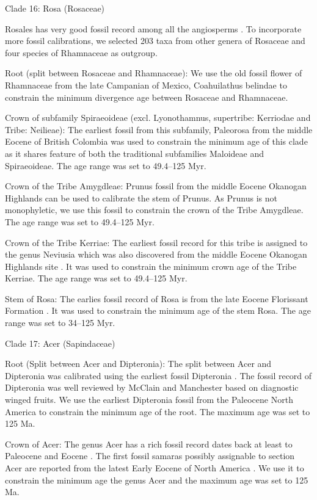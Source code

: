\documentclass[10pt]{article}
\begin{document}
Clade 16: Rosa (Rosaceae)

Rosales has very good fossil record among all the angiosperms
\citep{Xing2016}. To incorporate more fossil calibrations, we selected
203 taxa from other genera of Rosaceae and four species of Rhamnaceae
as outgroup.

Root (split between Rosaceae and Rhamnaceae): We use the old fossil
flower of Rhamnaceae from the late Campanian of Mexico, Coahuilathus
belindae \citep{Calvillo-Canadell2007} to constrain the minimum
divergence age between Rosaceae and Rhamnaceae.

Crown of subfamily Spiraeoideae (excl. Lyonothamnus, supertribe:
Kerriodae and Tribe: Neilieae): The earliest fossil from this
subfamily, Paleorosa from the middle Eocene of British Colombia
\citep{Basinger1976} was used to constrain the minimum age of this
clade as it shares feature of both the traditional subfamilies
Maloideae and Spiraeoideae. The age range was set to 49.4--125 Myr.

Crown of the Tribe Amygdleae: Prunus fossil from the middle Eocene
Okanogan Highlands \citep{DeVore2007} can be used to calibrate the
stem of Prunus. As Prunus is not monophyletic, we use this fossil to
constrain the crown of the Tribe Amygdleae. The age range was set to
49.4--125 Myr.

Crown of the Tribe Kerriae: The earliest fossil record for this tribe
is assigned to the genus Neviusia which was also discovered from the
middle Eocene Okanogan Highlands site \citep{DeVore2004}. It was used
to constrain the minimum crown age of the Tribe Kerriae. The age range
was set to 49.4--125 Myr.

Stem of Rosa: The earlies fossil record of Rosa is from the late
Eocene Florissant Formation \citep{Manchester2001}. It was used to
constrain the minimum age of the stem Rosa. The age range was set to
34--125 Myr.

Clade 17: Acer (Sapindaceae)

Root (Split between Acer and Dipteronia): The split between Acer and
Dipteronia was calibrated using the earliest fossil Dipteronia
\citep{McClain2001}. The fossil record of Dipteronia was well reviewed
by McClain and Manchester \citep{McClain2001} based on diagnostic
winged fruits. We use the earliest Dipteronia fossil from the
Paleocene North America to constrain the minimum age of the root. The
maximum age was set to 125 Ma.

Crown of Acer: The genus Acer has a rich fossil record dates back at
least to Paleocene and Eocene \citep{Wolfe1987,Mai1995}. The first
fossil samaras possibly assignable to section Acer are reported from
the latest Early Eocene of North America \citep{Wolfe1987}. We use it
to constrain the minimum age the genus Acer and the maximum age was
set to 125 Ma.
\end{document}
